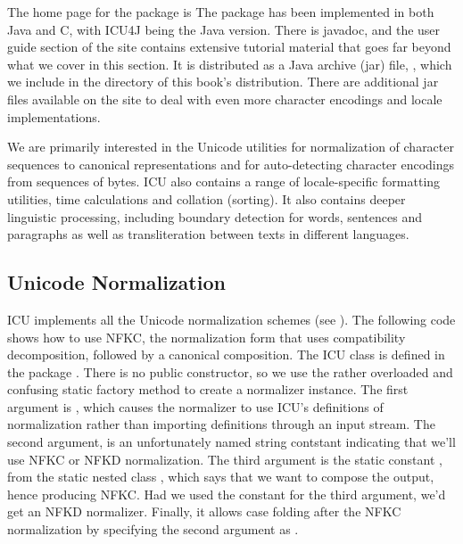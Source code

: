 The home page for the package is
%
%
The package has been implemented in both Java and C, with ICU4J
being the Java version.  There is javadoc, and the user guide
section of the site contains extensive tutorial material that goes
far beyond what we cover in this section.  It is distributed
as a Java archive (jar) file, ,
which we include in the 
directory of this book's distribution.  There are additional jar
files available on the site to deal with even more character
encodings and locale implementations.

We are primarily interested in the Unicode utilities for normalization
of character sequences to canonical representations and for
auto-detecting character encodings from sequences of bytes.  ICU also
contains a range of locale-specific formatting utilities, time
calculations and collation (sorting).  It also contains deeper
linguistic processing, including boundary detection for words,
sentences and paragraphs as well as transliteration between texts in
different languages.

\subsection{Unicode Normalization}\label{section:icu-unicode-normalization}

ICU implements all the Unicode normalization schemes (see
).  The following code shows how to use NFKC,
the normalization form that uses compatibility decomposition, followed
by a canonical composition.
%
%
The ICU class  is defined in the package
.  There is no public constructor, so we use the
rather overloaded and confusing static factory method
 to create a normalizer instance.  The first
argument is , which causes the normalizer to use ICU's
definitions of normalization rather than importing definitions through
an input stream.  The second argument,  is an
unfortunately named string contstant indicating that we'll use NFKC or
NFKD normalization.  The third argument is the static constant
, from the static nested class ,
which says that we want to compose the output, hence producing NFKC.
Had we used the constant  for the third argument, we'd
get an NFKD normalizer.  Finally, it allows case folding after the NFKC normalization
by specifying the second argument as .  

